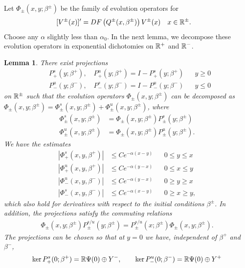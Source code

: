 \documentclass[12pt]{elsarticle}
\theoremstyle{plain}
\newtheorem{lemma}[theorem]{Lemma}
\theoremstyle{definition}
\theoremstyle{remark}
\numberwithin{theorem}{section}
\numberwithin{equation}{section}
\begin{document}
Let $\Phi_\pm(x, y; \beta^\pm)$ be the family of evolution operators for
\begin{align}\label{qpmODEs}
[V^\pm(x)]' &= D F\left(Q^\pm(x, \beta^\pm)\right) V^\pm(x) && x \in \mathbb{R}^\pm.
\end{align}
Choose any $\alpha$ slightly less than $\alpha_0$. In the next lemma, we decompose these evolution operators in exponential dichotomies on $\mathbb{R}^+$ and $\mathbb{R}^-$. 

\begin{lemma}\label{dichotomy1}
There exist projections
\begin{align*}
&P_+^s(y; \beta^+), \quad P_+^u(y; \beta^+) = I - P_+^s(y; \beta^+) && y \geq 0 \\
&P_-^u(y; \beta^-), \quad P_-^s(y; \beta^-) = I - P_-^u(y; \beta^-) && y \leq 0 
\end{align*}
on $\mathbb{R}^\pm$ such that the evolution operators $\Phi_\pm(x, y; \beta^\pm)$ can be decomposed as $\Phi_\pm(x, y; \beta^\pm) = \Phi^s_\pm(x, y; \beta^\pm) + \Phi^u_\pm(x, y; \beta^\pm)$, where
\begin{align*}
\Phi^s_\pm(x, y; \beta^\pm) &= \Phi_\pm(x, y; \beta^\pm) P^s_\pm(y; \beta^\pm) \\
\Phi^u_\pm(x, y; \beta^\pm) &= \Phi_\pm(x, y; \beta^\pm) P^u_\pm(y; \beta^\pm).
\end{align*}
We have the estimates
\begin{align*}
|\Phi^s_+(x, y, \beta^+)| &\leq C e^{-\alpha(x - y)} && 0 \leq y \leq x \\
|\Phi^u_+(x, y, \beta^+)| &\leq C e^{-\alpha(y - x)} && 0 \leq x \leq y \\
|\Phi^u_-(x, y, \beta^-)| &\leq C e^{-\alpha(y - x)} && 0 \geq y \geq x \\
|\Phi^s_-(x, y, \beta^-)| &\leq C e^{-\alpha(x - y)} && 0 \geq x \geq y,
\end{align*}
which also hold for derivatives with respect to the initial conditions $\beta^\pm$. In addition, the projections satisfy the commuting relations
\begin{align*}
\Phi_\pm(x, y; \beta^\pm) P^{s/u}_\pm(y; \beta^\pm) 
= P^{s/u}_\pm(x; \beta^\pm) \Phi_\pm(x, y; \beta^\pm).
\end{align*}
The projections can be chosen so that at $y = 0$ we have, independent of $\beta^+$ and $\beta^-$,
\begin{align*}
\ker P^s_+(0; \beta^+) &= \R \Psi(0) \oplus Y^-, \qquad
\ker P^u_-(0; \beta^-) = \R \Psi(0) \oplus Y^+ \\

\end{align*}
\end{lemma}
\end{document}
